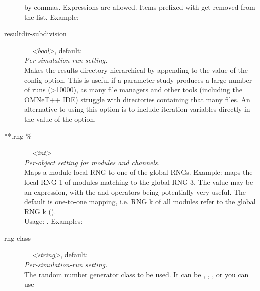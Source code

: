 \begin{description}
    by commas. Expressions are allowed. Items prefixed with
    \ttt{-{\allowbreak}} get removed from the list. Example:
\item[resultdir-subdivision] = \textit{<bool>}, default: \\
    \textit{Per-simulation-run setting.}\\
    Makes the results directory hierarchical by appending
     to the value of the
     config option. This is useful if a parameter
    study produces a large number of runs (>10000), as many file managers and
    other tools (including the OMNeT++ IDE) struggle with directories
    containing that many files. An alternative to using this option is to
    include iteration variables directly in the value of the
     option.
\item[**.rng-\%] = \textit{<int>}\\
    \textit{Per-object setting for modules and channels.}\\
    Maps a module-local RNG to one of the global RNGs. Example:
    maps the local RNG 1 of modules matching  to the
    global RNG 3. The value may be an expression, with the  and
     operators being potentially very useful. The
    default is one-to-one mapping, i.e. RNG k of all modules refer to the
    global RNG k ().\\
    Usage:
    .
    Examples:
\item[rng-class] = \textit{<string>}, default: \\
    \textit{Per-simulation-run setting.}\\
    The random number generator class to be used. It can be
    , , , or you can use

\end{description}
